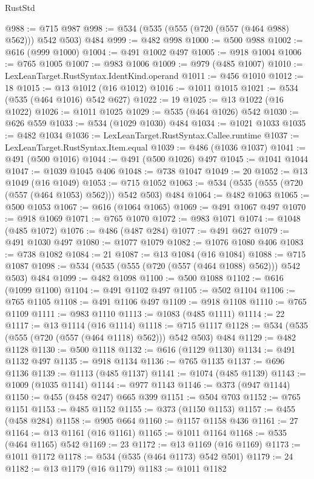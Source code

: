 \begin{lexlean}{RustStd}
\begin{coremodule}
{\begin{coremodule}
{{{{{{{{{{{{{{@988 := @715 @987
@998 := @534 (@535 (@555 (@720 (@557 (@464 @988) @562))) @542 @503) @484
@999 := @482 @998
@1000 := @500 @988
@1002 := @616 (@999 @1000)
@1004 := @491 @1002 @497
@1005 := @918 @1004
@1006 := @765 @1005
@1007 := @983 @1006
@1009 := @979 (@485 @1007)
@1010 := LexLeanTarget.RustSyntax.IdentKind.operand
@1011 := @456 @1010
@1012 := 18
@1015 := @13 @1012 (@16 @1012)
@1016 := @1011 @1015
@1021 := @534 (@535 (@464 @1016) @542 @627)
@1022 := 19
@1025 := @13 @1022 (@16 @1022)
@1026 := @1011 @1025
@1029 := @535 (@464 @1026) @542
@1030 := @626 @559
@1033 := @534 (@1029 @1030) @484
@1034 := @1021 @1033
@1035 := @482 @1034
@1036 := LexLeanTarget.RustSyntax.Callee.runtime
@1037 := LexLeanTarget.RustSyntax.Item.equal
@1039 := @486 (@1036 @1037)
@1041 := @491 (@500 @1016)
@1044 := @491 (@500 @1026) @497
@1045 := @1041 @1044
@1047 := @1039 @1045 @406
@1048 := @738 @1047
@1049 := 20
@1052 := @13 @1049 (@16 @1049)
@1053 := @715 @1052
@1063 := @534 (@535 (@555 (@720 (@557 (@464 @1053) @562))) @542 @503) @484
@1064 := @482 @1063
@1065 := @500 @1053
@1067 := @616 (@1064 @1065)
@1069 := @491 @1067 @497
@1070 := @918 @1069
@1071 := @765 @1070
@1072 := @983 @1071
@1074 := @1048 (@485 @1072)
@1076 := @486 (@487 @284)
@1077 := @491 @627
@1079 := @491 @1030 @497
@1080 := @1077 @1079
@1082 := @1076 @1080 @406
@1083 := @738 @1082
@1084 := 21
@1087 := @13 @1084 (@16 @1084)
@1088 := @715 @1087
@1098 := @534 (@535 (@555 (@720 (@557 (@464 @1088) @562))) @542 @503) @484
@1099 := @482 @1098
@1100 := @500 @1088
@1102 := @616 (@1099 @1100)
@1104 := @491 @1102 @497
@1105 := @502 @1104
@1106 := @765 @1105
@1108 := @491 @1106 @497
@1109 := @918 @1108
@1110 := @765 @1109
@1111 := @983 @1110
@1113 := @1083 (@485 @1111)
@1114 := 22
@1117 := @13 @1114 (@16 @1114)
@1118 := @715 @1117
@1128 := @534 (@535 (@555 (@720 (@557 (@464 @1118) @562))) @542 @503) @484
@1129 := @482 @1128
@1130 := @500 @1118
@1132 := @616 (@1129 @1130)
@1134 := @491 @1132 @497
@1135 := @918 @1134
@1136 := @765 @1135
@1137 := @696 @1136
@1139 := @1113 (@485 @1137)
@1141 := @1074 (@485 @1139)
@1143 := @1009 (@1035 @1141)
@1144 := @977 @1143
@1146 := @373 (@947 @1144)
@1150 := @455 (@458 @247) @665 @399
@1151 := @504 @703
@1152 := @765 @1151
@1153 := @485 @1152
@1155 := @373 (@1150 @1153)
@1157 := @455 (@458 @284)
@1158 := @905 @664
@1160 := @1157 @1158 @436
@1161 := 27
@1164 := @13 @1161 (@16 @1161)
@1165 := @1011 @1164
@1168 := @535 (@464 @1165) @542
@1169 := 23
@1172 := @13 @1169 (@16 @1169)
@1173 := @1011 @1172
@1178 := @534 (@535 (@464 @1173) @542 @501)
@1179 := 24
@1182 := @13 @1179 (@16 @1179)
@1183 := @1011 @1182
}}}}}}}}}}}}}}
\end{coremodule}}
\end{coremodule}
\end{lexlean}

